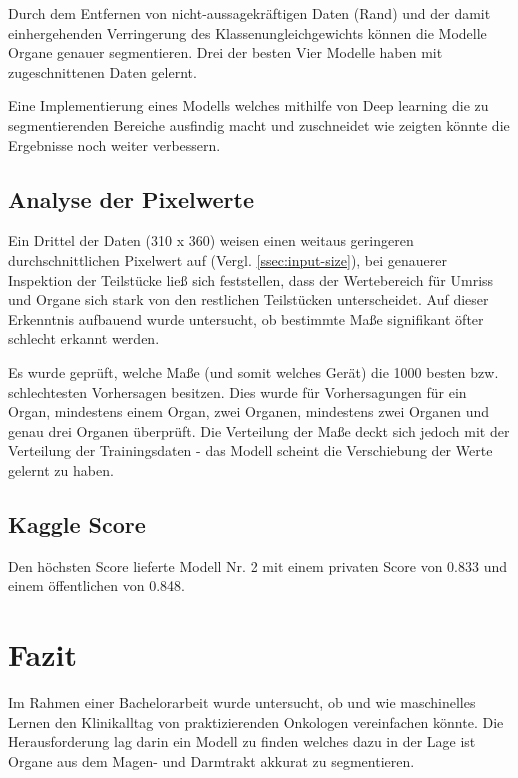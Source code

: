 Durch dem Entfernen von nicht-aussagekräftigen Daten (Rand) und der damit einhergehenden Verringerung des Klassenungleichgewichts können die Modelle Organe genauer segmentieren. Drei der besten Vier Modelle haben mit zugeschnittenen Daten gelernt. 

Eine Implementierung eines Modells welches mithilfe von Deep learning die zu segmentierenden Bereiche ausfindig macht und zuschneidet wie \citet{SmartCrop} zeigten könnte die Ergebnisse noch weiter verbessern.

\subsection{Analyse der Pixelwerte}

Ein Drittel der Daten (310 x 360) weisen einen weitaus geringeren durchschnittlichen Pixelwert auf (Vergl. \ref{ssec:input-size}), bei genauerer Inspektion der Teilstücke ließ sich feststellen, dass der Wertebereich für Umriss und Organe sich stark von den restlichen Teilstücken unterscheidet. Auf dieser Erkenntnis aufbauend wurde untersucht, ob bestimmte Maße signifikant öfter schlecht erkannt werden.

Es wurde geprüft, welche Maße (und somit welches Gerät) die 1000 besten bzw. schlechtesten Vorhersagen besitzen. Dies wurde für Vorhersagungen für ein Organ, mindestens einem Organ, zwei Organen, mindestens zwei Organen und genau drei Organen überprüft. Die Verteilung der Maße deckt sich jedoch mit der Verteilung der Trainingsdaten - das Modell scheint die Verschiebung der Werte gelernt zu haben. 

\subsection{Kaggle Score}

Den höchsten Score lieferte Modell Nr. 2 mit einem privaten Score von 0.833 und einem öffentlichen von 0.848.

\section{Fazit}\raggedbottom

Im Rahmen einer Bachelorarbeit wurde untersucht, ob und wie maschinelles Lernen den Klinikalltag von praktizierenden Onkologen vereinfachen könnte. Die Herausforderung lag darin ein Modell zu finden welches dazu in der Lage ist Organe aus dem Magen- und Darmtrakt akkurat zu segmentieren. 

